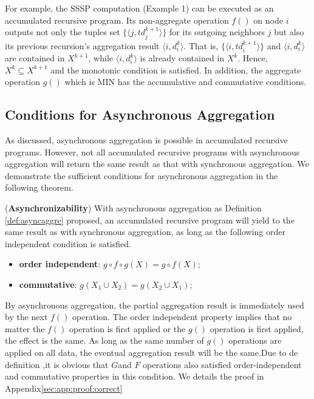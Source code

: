 For example, the SSSP computation (Example 1) can be executed as an accumulated recursive program. Its non-aggregate operation $f()$ on node $i$ outputs not only the tuples set $\{\langle j,td_j^{k+1}\rangle\}$ for its outgoing neighbors $j$ but also its previous recursion's aggregation result $\langle i,d_i^k\rangle$. That is, $\{\langle i,td_i^{k+1}\rangle\}$ and $\langle i,d_i^k\rangle$ are contained in $X^{k+1}$, while $\langle i,d_i^k\rangle$ is already contained in $X^{k}$. Hence, $X^{k}\subseteq X^{k+1}$ and the monotonic condition is satisfied. In addition, the aggregate operation $g()$ which is MIN has the accumulative and commutative conditions.


\subsection{Conditions for Asynchronous Aggregation}
\label{sec:async:condition}

As discussed, asynchronous aggregation is possible in accumulated recursive programs. However, not all accumulated recursive programs with asynchronous aggregation will return the same result as that with synchronous aggregation. We demonstrate the sufficient conditions for asynchronous aggregation in the following theorem.

\begin{theorem}
	\label{th:async}
	(\textbf{Asynchronizability}) With asynchronous aggregation as Definition \ref{def:asyncaggre} proposed, an accumulated recursive program will yield to the same result as with synchronous aggregation, as long as the following order independent condition is satisfied.
	\begin{itemize}
		\item \textbf{order independent}: $g\circ f\circ g(X)=g\circ f(X)$;
		\item \textbf{commutative}: $g(X_1\cup X_2)=g(X_2\cup X_1)$;
	\end{itemize}
\end{theorem}
By asynchronous aggregation, the partial aggregation result is immediately used by the next $f()$ operation. The order independent property implies that no matter the $f()$ operation is first applied or the $g()$ operation is first applied, the effect is the same. As long as the same number of $g()$ operations are applied on all data, the eventual aggregation result will be the same.Due to de definition ,it is obvious that $G$and $F$ operations also satisfied order-independent and commutative properties in this condition. We details the proof in Appendix\ref{sec:app:proof:correct}


